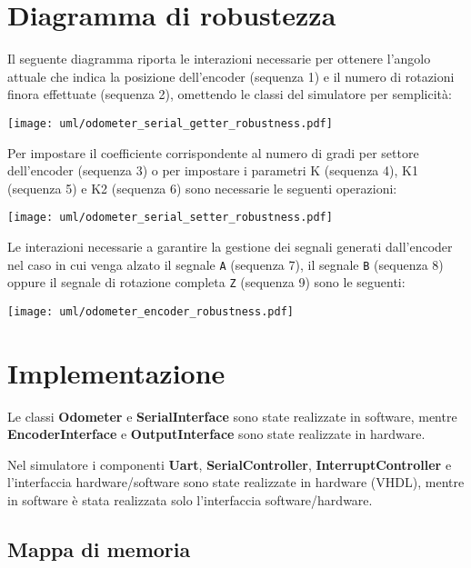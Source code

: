 \documentclass [11pt,a4paper,oneside]{paper}
\newcommand{\component}[1]{\textbf{#1}}
\newcommand{\identifier}[1]{\texttt{#1}}
\begin{document}
\section{Diagramma di robustezza}
Il seguente diagramma riporta le interazioni necessarie per ottenere
l'angolo attuale che indica la posizione dell'encoder (sequenza 1) e
il numero di rotazioni finora effettuate (sequenza 2), omettendo
le classi del simulatore per semplicità:
\begin{center}
    \texttt{[image: uml/odometer\_serial\_getter\_robustness.pdf]}
    \label{serial_getter_robustness}
\end{center}

Per impostare il coefficiente corrispondente al numero di gradi per settore
dell'encoder (sequenza 3) o per impostare i parametri K (sequenza 4), K1
(sequenza 5) e K2 (sequenza 6) sono necessarie le seguenti operazioni:
\begin{center}
    \texttt{[image: uml/odometer\_serial\_setter\_robustness.pdf]}
    \label{serial_getter_robustness}
\end{center}

Le interazioni necessarie a garantire la gestione dei segnali
generati dall'encoder nel caso in cui venga alzato il segnale
\identifier{A} (sequenza 7), il segnale \identifier{B} (sequenza 8)
oppure il segnale di rotazione completa \identifier{Z} (sequenza 9)
sono le seguenti:

\begin{center}
    \texttt{[image: uml/odometer\_encoder\_robustness.pdf]}
    \label{encoder_robustness}
\end{center}


\section{Implementazione}

Le classi \component{Odometer} e \component{SerialInterface} sono state
realizzate in software, mentre \component{EncoderInterface} e
\component{OutputInterface} sono state realizzate in hardware.

Nel simulatore i componenti \component{Uart},
\component{SerialController}, \component{InterruptController} e
l'interfaccia hardware/software sono state realizzate in hardware
(VHDL), mentre in software è stata realizzata solo l'interfaccia
software/hardware.

\subsection{Mappa di memoria}
\end{document}

